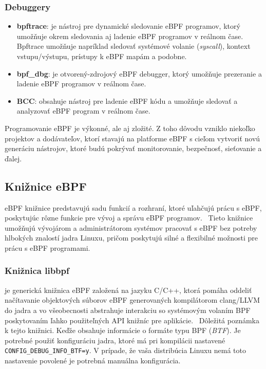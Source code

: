 \subsubsection{Debuggery}
\begin{itemize}
    \item \textbf{bpftrace}: je nástroj pre dynamické sledovanie eBPF programov, ktorý umožňuje okrem sledovania aj ladenie 
    eBPF programov v reálnom čase. Bpftrace umožňuje napríklad sledovať systémové volanie (\emph{syscall}), kontext vstupu/výstupu, 
    prístupy k eBPF mapám a podobne.~\cite{bpftrace}
    \item \textbf{bpf\_dbg}: je otvorený-zdrojový eBPF debugger, ktorý umožňuje prezeranie a ladenie eBPF programov v reálnom čase.
    \item \textbf{BCC}: obsahuje nástroj pre ladenie eBPF kódu a umožňuje sledovať a analyzovať eBPF program v reálnom čase.
\end{itemize}
Programovanie eBPF je výkonné, ale aj zložité. Z toho dôvodu vzniklo niekoľko projektov a dodávateľov, ktorí stavajú na platforme eBPF 
s cieľom vytvoriť novú generáciu nástrojov, ktoré budú pokrývať monitorovanie, bezpečnosť, sieťovanie a ďalej.

\subsection{Knižnice eBPF} 
eBPF knižnice predstavujú sadu funkcií a rozhraní, ktoré uľahčujú prácu s eBPF, poskytujúc rôzne funkcie pre vývoj a správu eBPF programov.~\cite{eBPF} 
Tieto knižnice umožňujú vývojárom a administrátorom systémov pracovať s eBPF bez potreby hlbokých znalostí jadra Linuxu, pričom poskytujú 
silné a flexibilné možnosti pre prácu s eBPF programami.

\subsubsection{Knižnica libbpf}
je generická knižnica eBPF založená na jazyku C/C++, ktorá pomáha oddeliť načítavanie objektových súborov eBPF generovaných kompilátorom clang/LLVM do jadra a vo 
všeobecnosti abstrahuje interakciu so systémovým volaním BPF poskytovaním ľahko použiteľných API knižníc pre aplikácie.~\cite{eBPF} Dôležitá poznámka k tejto knižnici. 
Keďže obsahuje informácie o formáte typu BPF (\emph{BTF}). Je potrebné použiť konfiguráciu jadra, ktoré má pri kompilácii nastavené \texttt{CONFIG\_DEBUG\_INFO\_BTF=y}. 
V prípade, že vaša distribúcia Linuxu nemá toto nastavenie povolené je potrebná manuálna konfigurácia.

